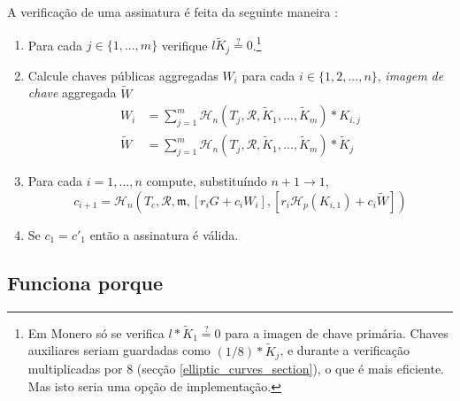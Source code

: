 \begin{description}
A verificação de uma assinatura é feita da seguinte maneira :

\begin{enumerate}
    \item Para cada $j \in \{1,...,m\}$ verifique $l \tilde{K}_j \stackrel{?}{=} 0$.\footnote{Em Monero só se verifica $l*\tilde{K}_1 \stackrel{?}{=} 0$ para a imagen de chave primária. Chaves auxiliares seriam guardadas como $(1/8)*\tilde{K}_j$, e durante a verificação multiplicadas por 8 (secção \ref{elliptic_curves_section}), o que é mais eficiente. Mas isto seria uma opção de implementação.}

    \item Calcule chaves públicas aggregadas $W_i$ para cada \(i \in \{1, 2, ..., n\}\), {\em imagem de chave} aggregada $\tilde{W}$\vspace{.175cm}
    \begin{align*}
    W_i &= \sum^{m}_{j=1} \mathcal{H}_n(T_j, \mathcal{R}, \tilde{K}_1,...,\tilde{K}_{m})*K_{i,j}\\
    \tilde{W} &= \sum^{m}_{j=1} \mathcal{H}_n(T_j, \mathcal{R}, \tilde{K}_1,...,\tilde{K}_{m})*\tilde{K}_j
    \end{align*}{}

	\item Para cada \(i = 1, ..., n\) compute, substituíndo \(n + 1 \rightarrow 1\),\vspace{.175cm}
	\[c_{i+1} = \mathcal{H}_n(T_c, \mathcal{R}, \mathfrak{m}, [r_i G + c_i W_i], [r_{i} \mathcal{H}_p(K_{i,1}) + c_i \tilde{W}])\]

	\item Se \(c_1 = c'_1\) então a assinatura é válida.
\end{enumerate}


\subsection*{Funciona porque}


\end{description}
